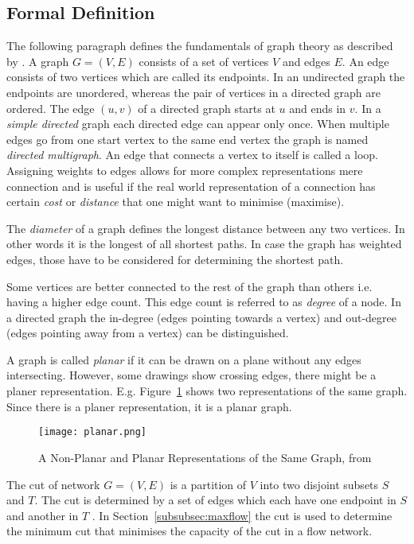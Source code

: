 \documentclass[final]{fhnwreport}       %
\begin{document}
\subsection{Formal Definition}\label{subsec:formal}
The following paragraph defines the fundamentals of graph theory as described by \citet{rosen_discrete_2012}.
A graph $G=(V,E)$ consists of a set of vertices $V$ and edges $E$. An edge consists of two vertices which are called its endpoints. In an undirected graph the endpoints are unordered, whereas the pair of vertices in a directed graph are ordered. The edge $(u, v)$ of a directed graph starts at $u$ and ends in $v$. In a \emph{simple directed} graph each directed edge can appear only once. When multiple edges go from one start vertex to the same end vertex the graph is named \emph{directed multigraph}. An edge that connects a vertex to itself is called a loop. Assigning weights to edges allows for more complex representations mere connection and is useful if the real world representation of a connection has certain \emph{cost} or \emph{distance} that one might want to minimise (maximise). 

The \emph{diameter} of a graph defines the longest distance between any two vertices. In other words it is the longest of all shortest paths. In case the graph has weighted edges, those have to be considered for determining the shortest path.

Some vertices are better connected to the rest of the graph than others i.e. having a higher edge count. This edge count is referred to as \emph{degree} of a node. In a directed graph the in-degree (edges pointing towards a vertex) and out-degree (edges pointing away from a vertex) can be distinguished. 

A graph is called \emph{planar} if it can be drawn on a plane without any edges intersecting. However, some drawings show crossing edges, there might be a planer representation. E.g. Figure~\ref{fig:planar} shows two representations of the same graph. Since there is a planer representation, it is a planar graph. 

\begin{figure}[H]
\centering
\texttt{[image: planar.png]}
\caption{A Non-Planar and Planar Representations of the Same Graph, from \cite{rosen_discrete_2012}}
\label{fig:planar}
\end{figure}

The cut of network $G=(V,E)$ is a partition of $V$ into two disjoint subsets $S$ and $T$. The cut is determined by a set of edges which each have one endpoint in $S$ and another in $T$ \citep{brossard_graph_2010}. In Section~\ref{subsubsec:maxflow} the cut is used to determine the minimum cut that minimises the capacity of the cut in a flow network.
\end{document}
